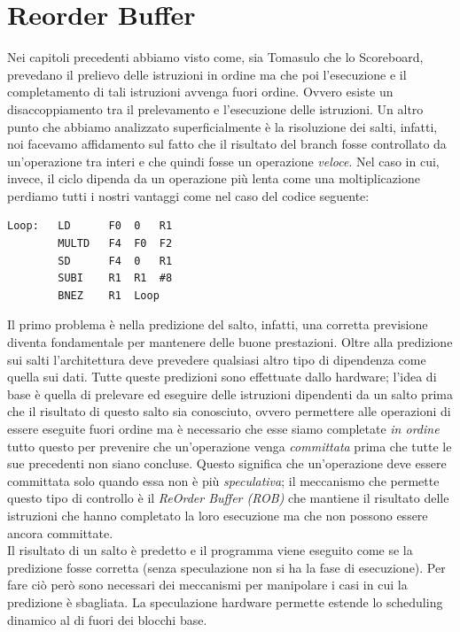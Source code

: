 \section{Reorder Buffer}\label{capitolo5}
Nei capitoli precedenti abbiamo visto come, sia Tomasulo che lo Scoreboard, prevedano il prelievo delle istruzioni in ordine ma che poi l'esecuzione e il completamento di tali istruzioni avvenga fuori ordine. Ovvero esiste un disaccoppiamento tra il prelevamento e l'esecuzione delle istruzioni. Un altro punto che abbiamo analizzato superficialmente è la risoluzione dei salti, infatti, noi facevamo affidamento sul fatto che il risultato del branch fosse controllato da un'operazione tra interi e che quindi fosse un operazione \emph{veloce}. Nel caso in cui, invece, il ciclo dipenda da un operazione più lenta come una moltiplicazione perdiamo tutti i nostri vantaggi come nel caso del codice seguente:
\begin{verbatim}
Loop:   LD      F0  0   R1
        MULTD   F4  F0  F2
        SD      F4  0   R1
        SUBI    R1  R1  #8
        BNEZ    R1  Loop
\end{verbatim}
Il primo problema è nella predizione del salto, infatti, una corretta previsione diventa fondamentale per mantenere delle buone prestazioni. Oltre alla predizione sui salti l'architettura deve prevedere qualsiasi altro tipo di dipendenza come quella sui dati. Tutte queste predizioni sono effettuate dallo hardware; l'idea di base è quella di prelevare ed eseguire delle istruzioni dipendenti da un salto prima che il risultato di questo salto sia conosciuto, ovvero permettere alle operazioni di essere eseguite fuori ordine ma è necessario che esse siamo completate \emph{in ordine} tutto questo per prevenire che un'operazione venga \emph{committata} prima che tutte le sue precedenti non siano concluse. Questo significa che un'operazione deve essere committata solo quando essa non è più \emph{speculativa}; il meccanismo che permette questo tipo di controllo è il \emph{ReOrder Buffer (ROB)} che mantiene il risultato delle istruzioni che hanno completato la loro esecuzione ma che non possono essere ancora committate.\\
Il risultato di un salto è predetto e il programma viene eseguito come se la predizione fosse corretta (senza speculazione non si ha la fase di esecuzione). Per fare ciò però sono necessari dei meccanismi per manipolare i casi in cui la predizione è sbagliata. La speculazione hardware permette estende lo scheduling dinamico al di fuori dei blocchi base.\\
